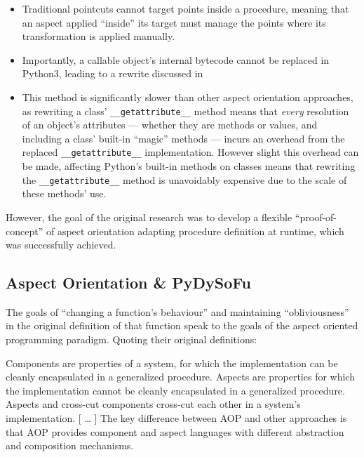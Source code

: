 \begin{itemize}
    \item Traditional pointcuts cannot target points inside a procedure, meaning
    that an aspect applied ``inside'' its target must manage the points where
    its transformation is applied manually.
    \item Importantly, a callable object's internal bytecode cannot be replaced
    in Python3, leading to a rewrite discussed in 
    \item This method is significantly slower than other aspect orientation
    approaches, as rewriting a class' \lstinline{__getattribute__} method means
    that \emph{every} resolution of an object's attributes --- whether they are
    methods or values, and including a class' built-in ``magic'' methods ---
    incurs an overhead from the replaced \lstinline{__getattribute__}
    implementation. However slight this overhead can be made, affecting Python's
    built-in methods on classes means that rewriting the
    \lstinline{__getattribute__} method is unavoidably expensive due to the
    scale of these methods' use.
\end{itemize}

However, the goal of the original research was to develop a flexible
``proof-of-concept'' of aspect orientation adapting procedure definition at
runtime, which was successfully
achieved\cite{wallis2018caise,wallis2018genetic}. 

\subsection{Aspect Orientation \& PyDySoFu}\label{subsec:pdsf_aop}

The goals of ``changing a function's behaviour'' and maintaining
``obliviousness'' in the original definition of that function speak to the goals
of the aspect oriented programming paradigm\cite{kiczales1997aspect}. Quoting
their original definitions:

\begin{displayquote}
    Components are properties of a system, for which the implementation can be
    cleanly encapsulated in a generalized procedure. Aspects are properties
    for which the implementation cannot be cleanly encapsulated in a
    generalized procedure. Aspects and cross-cut components cross-cut each other
    in a system’s implementation.
    [ \ldots{} ]
    The key difference between
    AOP and other approaches is that AOP provides component and aspect languages
    with different abstraction and composition mechanisms.
\end{displayquote}

